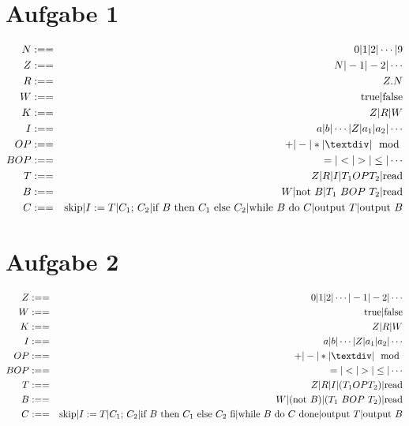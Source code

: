 




\newcommand{\nr}{1}


\section*{Aufgabe 1}
\begin{eqnarray}
N &:==& 0 | 1 | 2 | \cdots | 9 \\
Z &:==& N | -1 | -2 | \cdots \\
R &:==& Z . N \\
W &:==& \text{true} | \text{false} \\
K &:==& Z | R | W \\
I &:==& a | b | \cdots | Z | a_1 | a_2 | \cdots \\
OP &:==& + | - | * | ÷ | \mod \\
BOP &:==& = | < | > | \leq | \cdots \\
T &:==& Z | R | I | T_1 OP T_2 | \text{read} \\
B &:==& W | \text{not $B$} | \text{$T_1$ $BOP$ $T_2$}  | \text{read}\\
C &:==& \text{skip} | I:=T | \text{$C_1$; $C_2$} | \text{if $B$ then $C_1$ else $C_2$} | 
        \text{while $B$ do $C$} | \text{output $T$} | \text{output $B$}
\end{eqnarray}

\section*{Aufgabe 2}
\begin{eqnarray}
Z &:==& 0 | 1 | 2 | \cdots | -1 | -2 | \cdots \\
W &:==& \text{true} | \text{false} \\
K &:==& Z | R | W \\
I &:==& a | b | \cdots | Z | a_1 | a_2 | \cdots \\
OP &:==& + | - | * | ÷ | \mod \\
BOP &:==& = | < | > | \leq | \cdots \\
T &:==& Z | R | I | (T_1 OP T_2) | \text{read} \\
B &:==& W | (\text{not $B$}) | (\text{$T_1$ $BOP$ $T_2$})  | \text{read}\\
C &:==& \text{skip} | I:=T | \text{$C_1$; $C_2$} | \text{if $B$ then $C_1$ else $C_2$ fi} | 
        \text{while $B$ do $C$ done} | \text{output $T$} | \text{output $B$}
\end{eqnarray}

